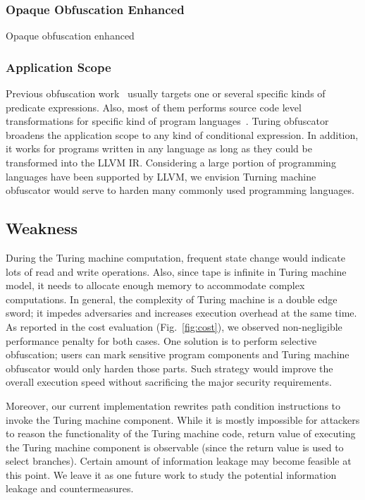 \documentclass[lnicst]{svmultln}
\begin{document}
\subsubsection{Opaque Obfuscation Enhanced}
Opaque obfuscation enhanced

\subsubsection{Application Scope}
Previous obfuscation work~\cite{Sharif} usually targets one or several specific
kinds of predicate expressions. Also, most of them performs source code level
transformations for specific kind of program languages~\cite{Trans}. Turing
obfuscator broadens the application scope to any kind of conditional expression.
In addition, it works for programs written in any language as long as they could
be transformed into the LLVM IR. Considering a large portion of programming
languages have been supported by LLVM, we envision Turning machine obfuscator
would serve to harden many commonly used programming languages.

\subsection{Weakness}
During the Turing machine computation, frequent state change would indicate lots
of read and write operations. Also, since tape is infinite in Turing machine
model, it needs to allocate enough memory to accommodate complex computations.
In general, the complexity of Turing machine is a double edge sword; it impedes
adversaries and increases execution overhead at the same time. As reported in
the cost evaluation (Fig.~\ref{fig:cost}), we observed non-negligible
performance penalty for both cases. One solution is to perform selective
obfuscation; users can mark sensitive program components and Turing machine
obfuscator would only harden those parts. Such strategy would improve the
overall execution speed without sacrificing the major security requirements.

Moreover, our current implementation rewrites path condition instructions to
invoke the Turing machine component. While it is mostly impossible for attackers
to reason the functionality of the Turing machine code, return value of
executing the Turing machine component is observable (since the return value is
used to select branches). Certain amount of information leakage may become
feasible at this point. We leave it as one future work to study the potential
information leakage and countermeasures.
\end{document}
